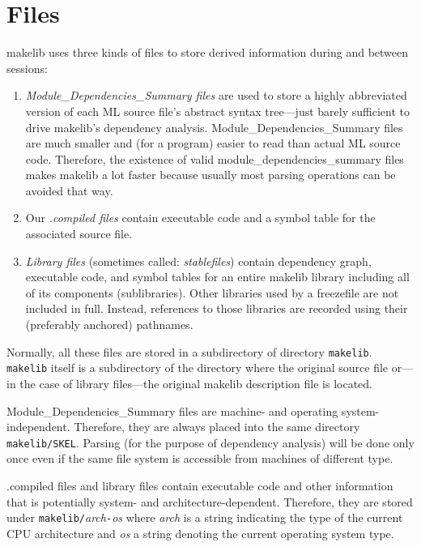 
\section{Files}
\label{sec:files}

makelib uses three kinds of files to store derived information during and
between sessions:

\begin{enumerate}
\item {\it Module_Dependencies_Summary files} are used to store a highly abbreviated
version of each ML source file's abstract syntax tree---just barely
sufficient to drive makelib's dependency analysis.  Module_Dependencies_Summary files are much
smaller and (for a program) easier to read than actual ML source code.
Therefore, the existence of valid module_dependencies_summary files makes makelib a lot faster
because usually most parsing operations can be avoided that way.
\item Our {\it .compiled files} 
contain executable code and a symbol table for the associated
source file.
\item {\it Library files} (sometimes called: {\em stablefiles}) contain
dependency graph, executable code, and symbol tables for an entire makelib
library including all of its components (sublibraries).  Other libraries
used by a freezefile are not included in full.  Instead,
references to those libraries are recorded using their (preferably
anchored) pathnames.
\end{enumerate}

Normally, all these files are stored in a subdirectory of directory
{\tt makelib}. {\tt makelib} itself is a subdirectory of the directory where the
original source file or---in the case of library files---the
original makelib description file is located.

Module_Dependencies_Summary files are machine- and operating system-independent.
Therefore, they are always placed into the same directory {\tt
makelib/SKEL}. Parsing (for the purpose of dependency analysis) will be
done only once even if the same file system is accessible from
machines of different type.

.compiled files and library files contain executable code and other
information that is potentially system- and architecture-dependent.
Therefore, they are stored under {\tt makelib/}{\it arch}{\tt -}{\it os}
where {\it arch} is a string indicating the type of the current
CPU architecture and {\it os} a string denoting the current operating
system type.

